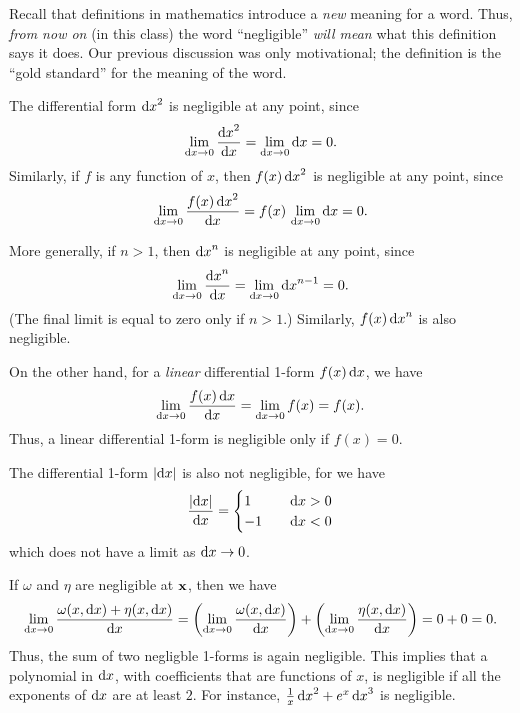 Recall that definitions in mathematics introduce a \emph{new} meaning for a word.
Thus, \emph{from now on} (in this class) the word ``negligible'' \emph{will mean} what this definition says it does.
Our previous discussion was only motivational; the definition is the ``gold standard'' for the meaning of the word.

\begin{eg}
  The differential form ${\mathrm{d} x}^2$ is negligible at any point, since
  \[ \lim_{{\mathrm{d} x}\to 0} \frac{{\mathrm{d} x}^2}{{\mathrm{d} x}} = \lim_{{\mathrm{d} x}\to 0} {\mathrm{d} x} = 0. \]
  Similarly, if $f$ is any function of $x$, then $f(x)\,{\mathrm{d} x}^2$ is negligible at any point, since
  \[ \lim_{{\mathrm{d} x}\to 0} \frac{f(x)\,{\mathrm{d} x}^2}{{\mathrm{d} x}} = f(x)\, \lim_{{\mathrm{d} x}\to 0} {\mathrm{d} x} = 0. \]
\end{eg}

\begin{eg}
  More generally, if $n > 1$, then ${\mathrm{d} x}^n$ is negligible at any point, since
  \[ \lim_{{\mathrm{d} x}\to 0} \frac{{\mathrm{d} x}^n}{{\mathrm{d} x}} = \lim_{{\mathrm{d} x}\to 0} {\mathrm{d} x}^{n-1} = 0. \]
  (The final limit is equal to zero only if $n>1$.)
  Similarly, $f(x)\,{\mathrm{d} x}^n$ is also negligible.
\end{eg}

\begin{eg}
  On the other hand, for a \emph{linear} differential 1-form $f(x)\,{\mathrm{d} x}$, we have
  \[ \lim_{{\mathrm{d} x}\to 0} \frac{f(x)\,{\mathrm{d} x}}{{\mathrm{d} x}} = \lim_{{\mathrm{d} x}\to 0} f(x) = f(x). \]
  Thus, a linear differential 1-form is negligible only if $f(x) = 0$.
\end{eg}

\begin{eg}
  The differential 1-form $|{\mathrm{d} x}|$ is also not negligible, for we have
  \[ \frac{|{\mathrm{d} x}|}{{\mathrm{d} x}} =
  \begin{cases}
    1 &\quad {\ensuremath{\mathrm{d} x}}>0\\
    -1 &\quad {\ensuremath{\mathrm{d} x}}<0
  \end{cases}\]
  which does not have a limit as ${\mathrm{d} x}\to 0$.
\end{eg}

\begin{eg}
  If $\omega$ and $\eta$ are negligible at $\mathbf{x}$, then we have
  \[ \lim_{{\mathrm{d} x}\to 0} \frac{\omega(x,{\mathrm{d} x}) + \eta(x,{\mathrm{d} x})}{{\mathrm{d} x}} =
  \left(\lim_{{\mathrm{d} x}\to 0} \frac{\omega(x,{\mathrm{d} x})}{{\mathrm{d} x}}\right) + \left(\lim_{{\mathrm{d} x}\to 0} \frac{\eta(x,{\mathrm{d} x})}{{\mathrm{d} x}}\right)
  = 0 + 0 = 0.
  \]
  Thus, the sum of two negligble 1-forms is again negligible.
  This implies that a polynomial in ${\mathrm{d} x}$, with coefficients that are functions of $x$, is negligible if all the exponents of ${\mathrm{d} x}$ are at least $2$.
  For instance, $\frac{1}{x}\,{\mathrm{d} x}^2 + e^x \,{\mathrm{d} x}^3$ is negligible.
\end{eg}

